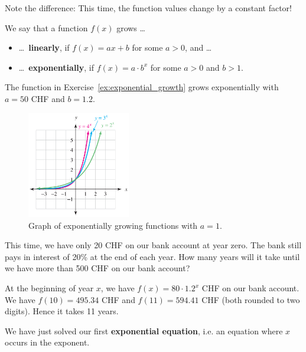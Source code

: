 \begin{tcolorbox}
	Note the difference: This time, the function values change by a constant factor!
\end{tcolorbox}
\begin{tcolorbox}
	We say that a function $f\left(x\right)$ grows \ldots
	\begin{itemize}
		\item[] \ldots\ \textbf{linearly}, if $f\left(x\right)=ax+b$ for some $a>0$, and \ldots
		\item[] \ldots\ \textbf{exponentially}, if $f\left(x\right)=a\cdot b^x$ for some $a>0$ and $b>1$.
	\end{itemize}
\end{tcolorbox}
\begin{example}
	The function in Exercise~\ref{ex:exponential_growth} grows exponentially with $a=50$ CHF and $b=1.2$.
\end{example}
\begin{figure}[ht]
	\centering
	\includegraphics[width=0.40\textwidth]{images/exponentalb}
	\caption{Graph of exponentially growing functions with $a=1$.}
	\label{fig:differentb}
\end{figure}
\begin{exercise} \label{ex:first_exponential_equation}
	This time, we have only 20 CHF on our bank account at year zero.
	The bank still pays in interest of 20\% at the end of each year.
	How many years will it take until we have more than 500 CHF on our bank account?
\end{exercise}
\begin{solution*}
	At the beginning of year $x$, we have $f\left(x\right)=80\cdot 1.2^x$ CHF on our bank account.
	We have $f\left(10\right)=495.34$ CHF and $f\left(11\right)=594.41$ CHF (both rounded to two digits).
	Hence it takes 11 years.
\end{solution*}
We have just solved our first \textbf{exponential equation}, i.e. an equation where $x$ occurs in the exponent.

